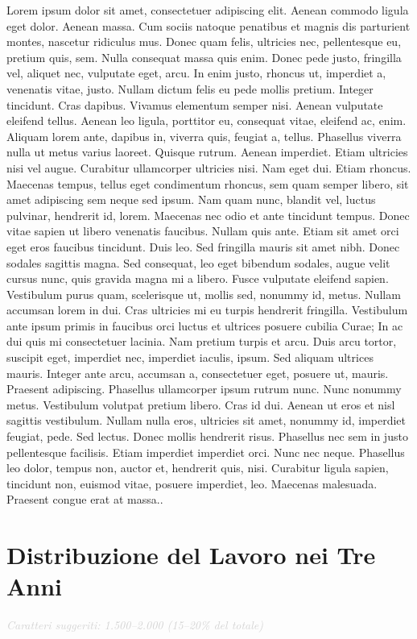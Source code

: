 \documentclass[a4paper,12pt]{article}
\begin{document}
Lorem ipsum dolor sit amet, consectetuer adipiscing elit. Aenean commodo ligula eget dolor. Aenean massa. Cum sociis natoque penatibus et magnis dis parturient montes, nascetur ridiculus mus. Donec quam felis, ultricies nec, pellentesque eu, pretium quis, sem. Nulla consequat massa quis enim. Donec pede justo, fringilla vel, aliquet nec, vulputate eget, arcu. In enim justo, rhoncus ut, imperdiet a, venenatis vitae, justo. Nullam dictum felis eu pede mollis pretium. Integer tincidunt. Cras dapibus. Vivamus elementum semper nisi. Aenean vulputate eleifend tellus. Aenean leo ligula, porttitor eu, consequat vitae, eleifend ac, enim. Aliquam lorem ante, dapibus in, viverra quis, feugiat a, tellus. Phasellus viverra nulla ut metus varius laoreet. Quisque rutrum. Aenean imperdiet. Etiam ultricies nisi vel augue. Curabitur ullamcorper ultricies nisi. Nam eget dui. Etiam rhoncus. Maecenas tempus, tellus eget condimentum rhoncus, sem quam semper libero, sit amet adipiscing sem neque sed ipsum. Nam quam nunc, blandit vel, luctus pulvinar, hendrerit id, lorem. Maecenas nec odio et ante tincidunt tempus. Donec vitae sapien ut libero venenatis faucibus. Nullam quis ante. Etiam sit amet orci eget eros faucibus tincidunt. Duis leo. Sed fringilla mauris sit amet nibh. Donec sodales sagittis magna. Sed consequat, leo eget bibendum sodales, augue velit cursus nunc, quis gravida magna mi a libero. Fusce vulputate eleifend sapien. Vestibulum purus quam, scelerisque ut, mollis sed, nonummy id, metus. Nullam accumsan lorem in dui. Cras ultricies mi eu turpis hendrerit fringilla. Vestibulum ante ipsum primis in faucibus orci luctus et ultrices posuere cubilia Curae; In ac dui quis mi consectetuer lacinia. Nam pretium turpis et arcu. Duis arcu tortor, suscipit eget, imperdiet nec, imperdiet iaculis, ipsum. Sed aliquam ultrices mauris. Integer ante arcu, accumsan a, consectetuer eget, posuere ut, mauris. Praesent adipiscing. Phasellus ullamcorper ipsum rutrum nunc. Nunc nonummy metus. Vestibulum volutpat pretium libero. Cras id dui. Aenean ut eros et nisl sagittis vestibulum. Nullam nulla eros, ultricies sit amet, nonummy id, imperdiet feugiat, pede. Sed lectus. Donec mollis hendrerit risus. Phasellus nec sem in justo pellentesque facilisis. Etiam imperdiet imperdiet orci. Nunc nec neque. Phasellus leo dolor, tempus non, auctor et, hendrerit quis, nisi. Curabitur ligula sapien, tincidunt non, euismod vitae, posuere imperdiet, leo. Maecenas malesuada. Praesent congue erat at massa..

\section{Distribuzione del Lavoro nei Tre Anni}
{\small\textcolor{lightgray}{\textit{Caratteri suggeriti: 1.500--2.000 (15--20\% del totale)}}}\\
\end{document}
